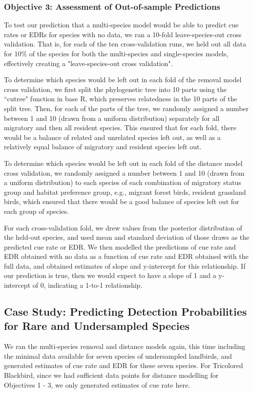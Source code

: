 \documentclass[12pt]{article}
\begin{document}
\subsubsection{Objective 3: Assessment of Out-of-sample Predictions}
\par To test our prediction that a multi-species model would be able to predict cue rates or EDRs for species with no data, we ran a 10-fold leave-species-out cross validation.
That is, for each of the ten cross-validation runs, we held out all data for 10\% of the species for both the multi-species and single-species models, effectively creating a "leave-species-out cross validation".

\par To determine which species would be left out in each fold of the removal model cross validation, we first split the phylogenetic tree into 10 parts using the ``cutree" function in base R, which preserves relatedness in the 10 parts of the split tree.
Then, for each of the parts of the tree, we randomly assigned a number between 1 and 10 (drawn from a uniform distribution) separately for all migratory and then all resident species.
This ensured that for each fold, there would be a balance of related and unrelated species left out, as well as a relatively equal balance of migratory and resident species left out.

\par To determine which species would be left out in each fold of the distance model cross validation, we randomly assigned a number between 1 and 10 (drawn from a uniform distribution) to each species of each combination of migratory status group and habitat preference group, e.g., migrant forest birds, resident grassland birds, which ensured that there would be a good balance of species left out for each group of species.

For each cross-validation fold, we drew values from the posterior distribution of the held-out species, and used mean and standard deviation of those draws as the predicted cue rate or EDR.
We then modelled the predictions of cue rate and EDR obtained with no data as a function of cue rate and EDR obtained with the full data, and obtained estimates of slope and y-intercept for this relationship.
If our prediction is true, then we would expect to have a slope of 1 and a y-intercept of 0, indicating a 1-to-1 relationship.

\subsection{Case Study: Predicting Detection Probabilities for Rare and Undersampled Species}
\par We ran the multi-species removal and distance models again, this time including the minimal data available for seven species of undersampled landbirds, and generated estimates of cue rate and EDR for these seven species.
For Tricolored Blackbird, since we had sufficient data points for distance modelling for Objectives 1 - 3, we only generated estimates of cue rate here.
\end{document}
